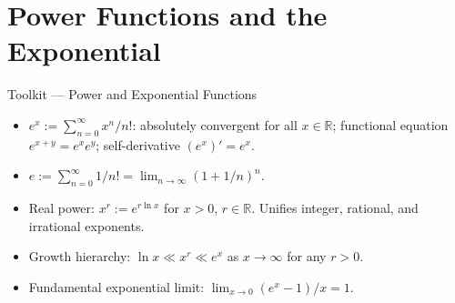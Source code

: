 \section{Power Functions and the Exponential}

\begin{toolkitbox}{Toolkit --- Power and Exponential Functions}
\begin{itemize}
  \item $e^x := \sum_{n=0}^\infty x^n/n!$: absolutely convergent for
    all $x \in \mathbb{R}$; functional equation $e^{x+y} = e^x e^y$;
    self-derivative $(e^x)' = e^x$.
  \item $e := \sum_{n=0}^\infty 1/n! = \lim_{n\to\infty}(1+1/n)^n$.
  \item Real power: $x^r := e^{r\ln x}$ for $x > 0$, $r \in \mathbb{R}$.
    Unifies integer, rational, and irrational exponents.
  \item Growth hierarchy: $\ln x \ll x^r \ll e^x$ as $x \to \infty$
    for any $r > 0$.
  \item Fundamental exponential limit: $\lim_{x \to 0}(e^x-1)/x = 1$.
\end{itemize}
\end{toolkitbox}


